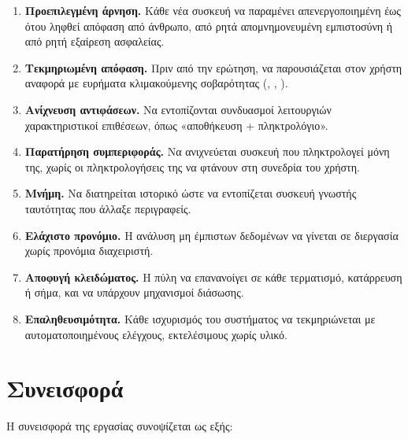 \begin{enumerate}[label=\textbf{Σ\arabic*.}]
  \item \textbf{Προεπιλεγμένη άρνηση.} Κάθε νέα συσκευή  να παραμένει
        απενεργοποιημένη έως ότου ληφθεί απόφαση από άνθρωπο, από ρητά
        απομνημονευμένη εμπιστοσύνη ή από ρητή εξαίρεση ασφαλείας.
  \item \textbf{Τεκμηριωμένη απόφαση.} Πριν από την ερώτηση, να παρουσιάζεται στον
        χρήστη αναφορά με ευρήματα κλιμακούμενης σοβαρότητας
        (\sevC, \sevW, \sevN).
  \item \textbf{Ανίχνευση αντιφάσεων.} Να εντοπίζονται συνδυασμοί λειτουργιών
        χαρακτηριστικοί επιθέσεων, όπως «αποθήκευση + πληκτρολόγιο».
  \item \textbf{Παρατήρηση συμπεριφοράς.} Να ανιχνεύεται συσκευή που
        πληκτρολογεί μόνη της, χωρίς οι πληκτρολογήσεις της να φτάνουν στη
        συνεδρία του χρήστη.
  \item \textbf{Μνήμη.} Να διατηρείται ιστορικό ώστε να εντοπίζεται συσκευή
        γνωστής ταυτότητας που άλλαξε περιγραφείς.
  \item \textbf{Ελάχιστο προνόμιο.} Η ανάλυση μη έμπιστων δεδομένων να γίνεται
        σε διεργασία χωρίς προνόμια διαχειριστή.
  \item \textbf{Αποφυγή κλειδώματος.} Η πύλη να επανανοίγει σε κάθε τερματισμό,
        κατάρρευση ή σήμα, και να υπάρχουν μηχανισμοί διάσωσης.
  \item \textbf{Επαληθευσιμότητα.} Κάθε ισχυρισμός του συστήματος να
        τεκμηριώνεται με αυτοματοποιημένους ελέγχους, εκτελέσιμους χωρίς υλικό.
\end{enumerate}

\section{Συνεισφορά}
\label{sec:contributions}

Η συνεισφορά της εργασίας συνοψίζεται ως εξής:

